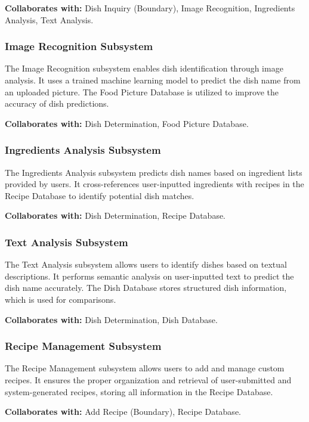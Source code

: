 \documentclass[]{article}
\begin{document}
\textbf{Collaborates with:} Dish Inquiry (Boundary), Image Recognition, Ingredients Analysis, Text Analysis.

\subsubsection{Image Recognition Subsystem}
The Image Recognition subsystem enables dish identification through image analysis. It uses a trained machine learning model to predict the dish name from an uploaded picture. The Food Picture Database is utilized to improve the accuracy of dish predictions.

\textbf{Collaborates with:} Dish Determination, Food Picture Database.

\subsubsection{Ingredients Analysis Subsystem}
The Ingredients Analysis subsystem predicts dish names based on ingredient lists provided by users. It cross-references user-inputted ingredients with recipes in the Recipe Database to identify potential dish matches.

\textbf{Collaborates with:} Dish Determination, Recipe Database.

\subsubsection{Text Analysis Subsystem}
The Text Analysis subsystem allows users to identify dishes based on textual descriptions. It performs semantic analysis on user-inputted text to predict the dish name accurately. The Dish Database stores structured dish information, which is used for comparisons.

\textbf{Collaborates with:} Dish Determination, Dish Database.

\subsubsection{Recipe Management Subsystem}
The Recipe Management subsystem allows users to add and manage custom recipes. It ensures the proper organization and retrieval of user-submitted and system-generated recipes, storing all information in the Recipe Database.

\textbf{Collaborates with:} Add Recipe (Boundary), Recipe Database.


	
\end{document}
